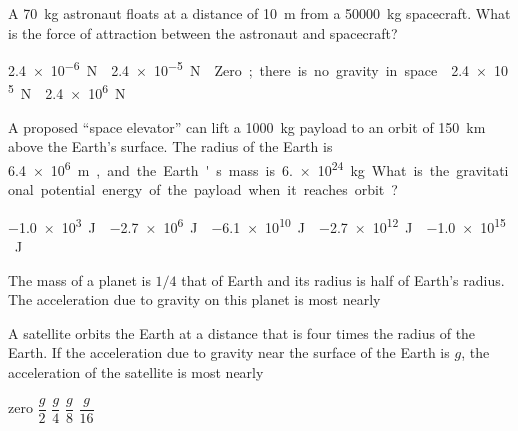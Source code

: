 \documentclass{../../../oss-apphys-exam}
\begin{document}

\raggedcolumns


\begin{questions}

  \question A \SI{70}{\kilo\gram} astronaut floats at a distance of
  \SI{10}{\metre} from a \SI{50000}{\kilo\gram} spacecraft. What is the force
  of attraction between the astronaut and spacecraft?
  \begin{choices}
    \choice\SI{2.4e-6}\newton
    \choice\SI{2.4e-5}\newton
    \choice Zero; there is no gravity in space.
    \choice\SI{2.4e5}\newton
    \choice\SI{2.4e6}\newton
  \end{choices}
    
  \question A proposed ``space elevator'' can lift a \SI{1000}{\kilo\gram}
  payload to an orbit of \SI{150}{\kilo\metre} above the Earth's surface. The
  radius of the Earth is \SI{6.4e6}\metre, and the Earth's mass is
  \SI{6.e24}{\kilo\gram}. What is the gravitational potential energy of the
  payload when it reaches orbit?
  \begin{choices}
    \choice\SI{-1.0e3}\joule
    \choice\SI{-2.7e6}\joule
    \choice\SI{-6.1e10}\joule
    \choice\SI{-2.7e12}\joule
    \choice\SI{-1.0e15}\joule
  \end{choices}

  \question The mass of a planet is $1/4$ that of Earth and its radius is
  half of Earth's radius. The acceleration due to gravity on this planet is
  most nearly

  \question A satellite orbits the Earth at a distance that is four times the
  radius of the Earth. If the acceleration due to gravity near the surface of
  the Earth is $g$, the acceleration of the satellite is most nearly
  \begin{choices}
    \choice zero
    \choice $\dfrac g2$
    \choice $\dfrac g4$
    \choice $\dfrac g8$
    \choice $\dfrac g{16}$
  \end{choices}
    

\end{questions}
\end{document}
